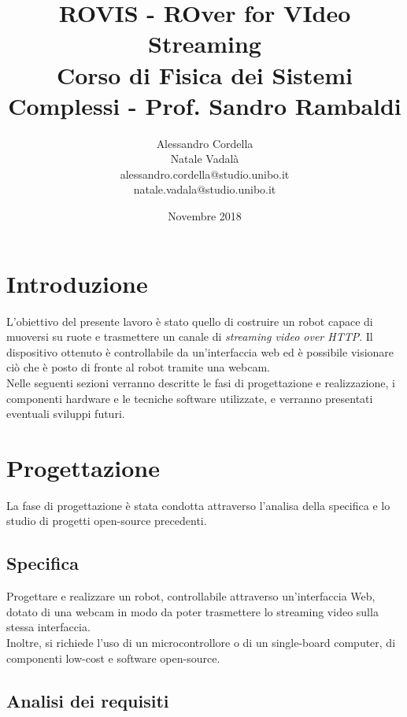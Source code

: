 \documentclass[11pt]{article}
\begin{document}
	\title{ROVIS - ROver for VIdeo Streaming\large\\Corso di Fisica dei Sistemi Complessi - Prof. Sandro Rambaldi}

	
	\author{Alessandro Cordella \\Natale Vadalà\\alessandro.cordella@studio.unibo.it\\natale.vadala@studio.unibo.it}\large
	\date{Novembre 2018}
	\maketitle
	\newpage
	\tableofcontents
	\newpage
\section{Introduzione}
L'obiettivo del presente lavoro è stato quello di costruire un robot capace di muoversi su ruote e trasmettere un canale di \textit{streaming video over HTTP}. Il dispositivo ottenuto è controllabile da un'interfaccia web ed è possibile visionare ciò che è posto di fronte al robot tramite una webcam.\\
Nelle seguenti sezioni verranno descritte le fasi di progettazione e realizzazione, i componenti hardware e le tecniche software utilizzate, e verranno presentati eventuali sviluppi futuri.
\section{Progettazione}
La fase di progettazione è stata condotta attraverso l'analisa della specifica e lo studio di progetti open-source precedenti.
\subsection{Specifica}
Progettare e realizzare un robot, controllabile attraverso un'interfaccia Web, dotato di una webcam in modo da poter trasmettere lo streaming video sulla stessa interfaccia.\\
Inoltre, si richiede l'uso di un microcontrollore o di un single-board computer, di componenti low-cost e software open-source.
\subsection{Analisi dei requisiti}
\end{document}
